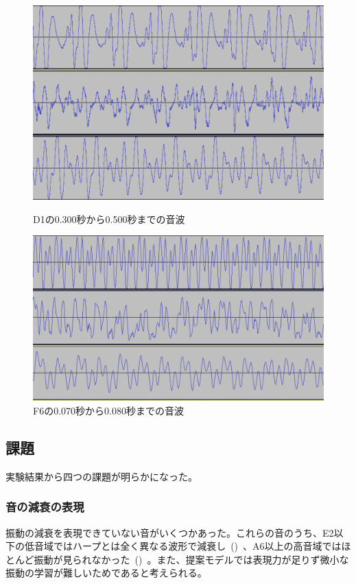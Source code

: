 \begin{figure}[b]
\centering
\begin{minipage}{0.48\columnwidth}
\centering
\includegraphics[width=0.75\columnwidth]{figure/66_22_det/d1_0300_0500.png}
\caption[D1の音波]{D1の0.300秒から0.500秒までの音波}
\label{fig:66_22_bad1}
\end{minipage}
\begin{minipage}{0.48\columnwidth}
\centering
\includegraphics[width=0.85\columnwidth]{figure/66_22_det/f6_0070_0080.png}
\caption[F6の音波]{F6の0.070秒から0.080秒までの音波}
\label{fig:66_22_bad2}
\end{minipage}
\end{figure}

\subsection{課題}

実験結果から四つの課題が明らかになった。

\subsubsection{音の減衰の表現}

振動の減衰を表現できていない音がいくつかあった。これらの音のうち、E2以下の低音域ではハープとは全く異なる波形で減衰し~()~、A6以上の高音域ではほとんど振動が見られなかった~()~。また、提案モデルでは表現力が足りず微小な振動の学習が難しいためであると考えられる。

